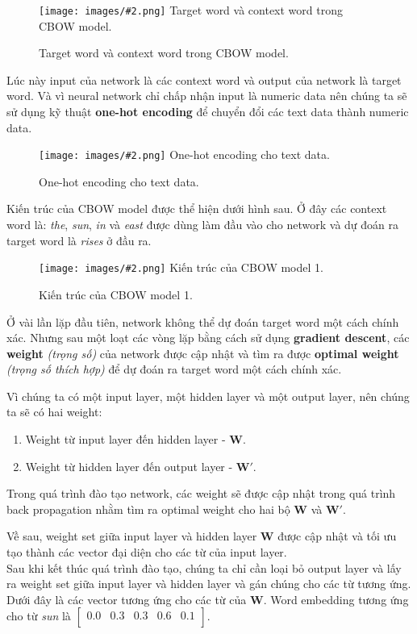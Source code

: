 \documentclass[12pt]{article}
\newcommand{\itemsizePaddingLeft}{\setlength{\itemindent}{0.6cm}}
\newcommand{\includeImage}[3]{
\begin{figure}[H]
  \centering
  \texttt{[image: images/\#2.png]}
  \def\temp{#3}\ifx\temp\empty\else\caption{#3}\fi
\end{figure}}
\begin{document}
\includeImage{0.7}{04}{Target word và context word trong CBOW model.}

\indent Lúc này input của network là các context word và output của network là target word. Và vì neural network chỉ chấp nhận input là numeric data nên chúng ta sẽ sử dụng kỹ thuật \textbf{one-hot encoding} để chuyển đổi các text data thành numeric data.

\includeImage{0.6}{05}{One-hot encoding cho text data.}

\indent Kiến trúc của CBOW model được thể hiện dưới hình sau. Ở đây các context word là: \textsl{the}, \textsl{sun}, \textsl{in} và \textsl{east} được dùng làm đầu vào cho network và dự đoán ra target word là \textsl{rises} ở đầu ra.

\includeImage{0.99}{06}{Kiến trúc của CBOW model 1.}

\indent Ở vài lần lặp đầu tiên, network không thể dự đoán target word một cách chính xác. Nhưng sau một loạt các vòng lặp bằng cách sử dụng \textbf{gradient descent}, các \textbf{weight} \textit{(trọng số)} của network được cập nhật và tìm ra được \textbf{optimal weight} \textit{(trọng số thích hợp)} để dự đoán ra target word một cách chính xác.

\vskip 0.5cm
\indent Vì chúng ta có một input layer, một hidden layer và một output layer, nên chúng ta sẽ có hai weight:
\begin{enumerate}
  \itemsizePaddingLeft
  \item Weight từ input layer đến hidden layer - $\boldsymbol{W}$.
  \item Weight từ hidden layer đến output layer - $\boldsymbol{W'}$.
\end{enumerate}

\indent Trong quá trình đào tạo network, các weight sẽ được cập nhật trong quá trình back propagation nhằm tìm ra optimal weight cho hai bộ $\boldsymbol{W}$ và $\boldsymbol{W'}$.

\vskip 0.5cm
\indent Về sau, weight set giữa input layer và hidden layer $\boldsymbol{W}$ được cập nhật và tối ưu tạo thành các vector đại diện cho các từ của input layer.\\

\indent Sau khi kết thúc quá trình đào tạo, chúng ta chỉ cần loại bỏ output layer và lấy ra weight set giữa input layer và hidden layer và gán chúng cho các từ tương ứng.\\

\indent Dưới đây là các vector tương ứng cho các từ của $\boldsymbol{W}$. Word embedding tương ứng cho từ \textsl{sun} là $\begin{bmatrix} 0.0 & 0.3 & 0.3 & 0.6 & 0.1 \\ \end{bmatrix}$.
\end{document}
